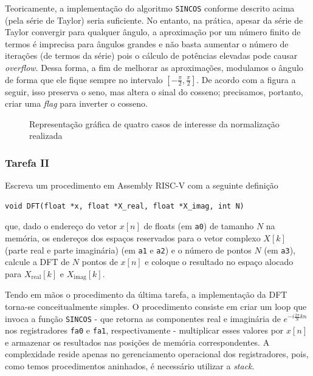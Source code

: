 \documentclass[a4paper,12pt]{article}
\newcommand{\cod}[1]{\texttt{#1}}
\begin{document}
Teoricamente, a implementação do algoritmo \cod{SINCOS} conforme descrito acima (pela série de Taylor) seria suficiente. No entanto, na prática, apesar da série de Taylor convergir para qualquer ângulo, a aproximação por um número finito de termos é imprecisa para ângulos grandes e não basta aumentar o número de iterações (de termos da série) pois o cálculo de potências elevadas pode causar \textit{overflow}. Dessa forma, a fim de melhorar as aproximações, modulamos o ângulo de forma que ele fique sempre no intervalo $\left[-\frac{\pi}{2}, \frac{\pi}{2}\right]$. De acordo com a figura a seguir, isso preserva o seno, mas altera o sinal do cosseno; precisamos, portanto, criar uma \textit{flag} para inverter o cosseno.

\begin{figure}[H]
    \centering
    
    \caption{Representação gráfica de quatro casos de interesse da normalização realizada}
\end{figure}

\subsubsection{Tarefa II}
\begin{tcolorbox}[title=Enunciado, colback=blue!5!white, colframe=blue!75!black]
Escreva um procedimento em Assembly RISC-V com a seguinte definição 
\begin{center}
\vspace{-10pt}
\begin{minipage}{0.8\textwidth}
\begin{verbatim}
void DFT(float *x, float *X_real, float *X_imag, int N)
\end{verbatim}
\end{minipage}
\vspace{-10pt}
\end{center}
que, dado o endereço do vetor $x[n]$ de floats (em \cod{a0}) de tamanho $N$ na memória, os endereços dos espaços reservados para o vetor complexo $X[k]$ (parte real e parte imaginária) (em \cod{a1} e \cod{a2}) e o número de pontos $N$ (em \cod{a3}), calcule a DFT de $N$ pontos de $x[n]$ e coloque o resultado no espaço alocado para $X_{\mathrm{real}}[k]$ e $X_{\mathrm{imag}}[k]$.
\end{tcolorbox}

Tendo em mãos o procedimento da última tarefa, a implementação da DFT torna-se conceitualmente simples. O procedimento consiste em criar um loop que invoca a função \cod{SINCOS} - que retorna as componentes real e imaginária de $e^{-i\frac{2\pi}{N}kn}$ nos registradores \cod{fa0} e \cod{fa1}, respectivamente - multiplicar esses valores por $x[n]$ e armazenar os resultados nas posições de memória correspondentes. A complexidade reside apenas no gerenciamento operacional dos registradores, pois, como temos procedimentos aninhados, é necessário utilizar a \textit{stack}.
\end{document}
